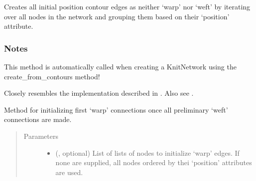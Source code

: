 \documentclass[letterpaper,10pt,english]{sphinxmanual}
\begin{document}
\begin{fulllineitems}
\begin{fulllineitems}
\end{fulllineitems}


\begin{fulllineitems}
\label{\detokenize{cockatoo:cockatoo.KnitNetwork.initialize_position_contour_edges}}
Creates all initial position contour edges as neither ‘warp’ nor ‘weft’
by iterating over all nodes in the network and grouping them based on
their ‘position’ attribute.
\subsubsection*{Notes}

This method is automatically called when creating a KnitNetwork using
the create\_from\_contours method!

Closely resembles the implementation described in  \sphinxfootnotemark[1]. Also see
 \sphinxfootnotemark[2].

\end{fulllineitems}


\begin{fulllineitems}
\label{\detokenize{cockatoo:cockatoo.KnitNetwork.initialize_warp_edges}}
Method for initializing first ‘warp’ connections once all preliminary
‘weft’ connections are made.
\begin{quote}\begin{description}
\item[{Parameters}] \leavevmode\begin{itemize}
\item {} 
 (, optional) \textendash{} 
List of lists of nodes to initialize ‘warp’ edges. If none are
supplied, all nodes ordered by thei ‘position’ attributes are
used.


\end{itemize}
\end{description}
\end{quote}
\end{fulllineitems}
\end{fulllineitems}
\end{document}
